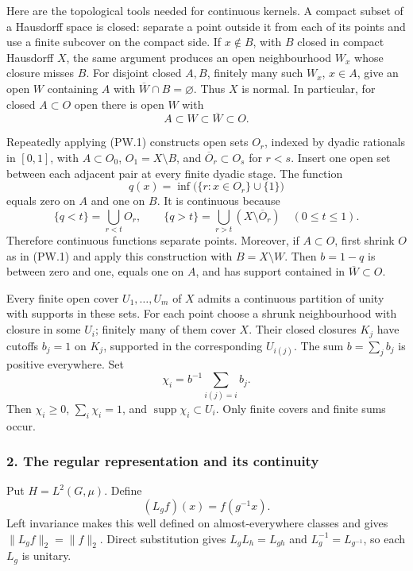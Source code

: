 \documentclass[
  11pt,
]{article}
\begin{document}
Here are the topological tools needed for continuous kernels. A compact
subset of a Hausdorff space is closed: separate a point outside it from
each of its points and use a finite subcover on the compact side. If
\(x\notin B\), with \(B\) closed in compact Hausdorff \(X\), the same
argument produces an open neighbourhood \(W_x\) whose closure misses
\(B\). For disjoint closed \(A,B\), finitely many such \(W_x\),
\(x\in A\), give an open \(W\) containing \(A\) with
\(\overline W\cap B=\varnothing\). Thus \(X\) is normal. In particular,
for closed \(A\subset O\) open there is open \(W\) with \[
A\subset W\subset\overline W\subset O.
\tag{PW.1}
\]

Repeatedly applying (PW.1) constructs open sets \(O_r\), indexed by
dyadic rationals in \([0,1]\), with \(A\subset O_0\),
\(O_1=X\setminus B\), and \(\overline O_r\subset O_s\) for \(r<s\).
Insert one open set between each adjacent pair at every finite dyadic
stage. The function \[
q(x)=\inf\bigl(\{r:x\in O_r\}\cup\{1\}\bigr)
\] equals zero on \(A\) and one on \(B\). It is continuous because \[
\{q<t\}=\bigcup_{r<t}O_r,\qquad
\{q>t\}=\bigcup_{r>t}(X\setminus\overline O_r)
\quad(0\leq t\leq1).
\] Therefore continuous functions separate points. Moreover, if
\(A\subset O\), first shrink \(O\) as in (PW.1) and apply this
construction with \(B=X\setminus W\). Then \(b=1-q\) is between zero and
one, equals one on \(A\), and has support contained in
\(\overline W\subset O\).

Every finite open cover \(U_1,\ldots,U_m\) of \(X\) admits a continuous
partition of unity with supports in these sets. For each point choose a
shrunk neighbourhood with closure in some \(U_i\); finitely many of them
cover \(X\). Their closed closures \(K_j\) have cutoffs \(b_j=1\) on
\(K_j\), supported in the corresponding \(U_{i(j)}\). The sum
\(b=\sum_jb_j\) is positive everywhere. Set \[
\chi_i=b^{-1}\sum_{i(j)=i}b_j.
\] Then \(\chi_i\geq0\), \(\sum_i\chi_i=1\), and
\(\operatorname{supp}\chi_i\subset U_i\). Only finite covers and finite
sums occur.

\subsubsection{2. The regular representation and its
continuity}\label{the-regular-representation-and-its-continuity}

Put \(H=L^2(G,\mu)\). Define \[
(L_gf)(x)=f(g^{-1}x).
\tag{PW.2}
\] Left invariance makes this well defined on almost-everywhere classes
and gives \(\|L_gf\|_2=\|f\|_2\). Direct substitution gives
\(L_gL_h=L_{gh}\) and \(L_g^{-1}=L_{g^{-1}}\), so each \(L_g\) is
unitary.
\end{document}

